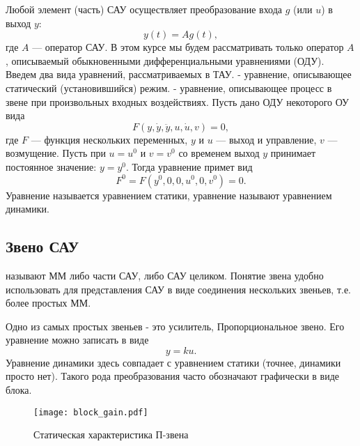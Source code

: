 \documentclass[../../TAU.tex]{subfiles}
\begin{document}
    Любой элемент (часть) САУ осуществляет преобразование входа 
    $g$ (или $u$) в выход $y$:
    \begin{equation}
        y(t) = A g(t),
    \end{equation}
    где $A$ --- оператор САУ. В этом курсе мы будем рассматривать только оператор $A$, описываемый обыкновенными дифференциальными уравнениями (ОДУ). Введем два вида уравнений, рассматриваемых в ТАУ.
     - уравнение, описывающее статический (установившийся) режим.
     - уравнение, описывающее процесс в звене при произвольных входных воздействиях.
    Пусть дано ОДУ некоторого ОУ вида
    \begin{equation}\label{EQ_DYNAMIC}
        F(y,\dot y, \ddot y, u, \dot u, v) = 0,
    \end{equation}
    где $F$ --- функция нескольких переменных, $y$ и $u$ --- выход и управление, $v$ --- возмущение.
    Пусть при $u=u^0$ и $v=v^0$ со временем выход $y$ принимает постоянное значение: $y=y^0$. Тогда уравнение 
    примет вид
    \begin{equation}\label{EQ_STATIC}
        F^0=F(y^0, 0, 0, u^0, 0, v^0) = 0.
    \end{equation}
    Уравнение 
    называется уравнением статики, уравнение 
    называют уравнением динамики.

\subsection{Звено САУ}

    \cite[стр. 21-22]{kim:uch}
    
     называют ММ либо части САУ, либо САУ целиком. Понятие звена удобно использовать для представления САУ в виде соединения нескольких звеньев, т.е. более простых ММ.

    Одно из самых простых звеньев - это усилитель, Пропорциональное звено. Его уравнение можно записать в виде
    \begin{equation}
        y = ku.
    \end{equation}
    Уравнение динамики здесь совпадает с уравнением статики (точнее, динамики просто нет). Такого рода преобразования часто обозначают графически в виде блока.
    \begin{figure}[h]
        \centering
        \texttt{[image: block\_gain.pdf]}
        \caption{Статическая характеристика П-звена}
        \centering
    \end{figure}
\end{document}
